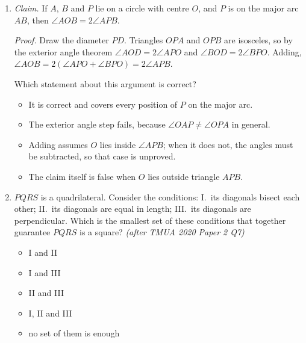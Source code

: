 \documentclass[11pt,a4paper]{article}
\begin{document}
\begin{enumerate}
\item \emph{Claim.} If $A$, $B$ and $P$ lie on a circle with centre $O$, and $P$ is on the major arc $AB$, then $\angle AOB=2\angle APB$.

\emph{Proof.} Draw the diameter $PD$. Triangles $OPA$ and $OPB$ are isosceles, so by the exterior angle theorem $\angle AOD=2\angle APO$ and $\angle BOD=2\angle BPO$. Adding, $\angle AOB=2(\angle APO+\angle BPO)=2\angle APB$.

Which statement about this argument is correct?
\begin{itemize}
\item[A)] It is correct and covers every position of $P$ on the major arc.
\item[B)] The exterior angle step fails, because $\angle OAP\ne\angle OPA$ in general.
\item[C)] Adding assumes $O$ lies inside $\angle APB$; when it does not, the angles must be subtracted, so that case is unproved.
\item[D)] The claim itself is false when $O$ lies outside triangle $APB$.
\end{itemize}


\item $PQRS$ is a quadrilateral. Consider the conditions: I.\ its diagonals bisect each other; \quad II.\ its diagonals are equal in length; \quad III.\ its diagonals are perpendicular. Which is the smallest set of these conditions that together guarantee $PQRS$ is a square? \textit{\small(after TMUA 2020 Paper 2 Q7)}
\begin{itemize}
\item[A)] I and II
\item[B)] I and III
\item[C)] II and III
\item[D)] I, II and III
\item[E)] no set of them is enough
\end{itemize}


\end{enumerate}
\end{document}

